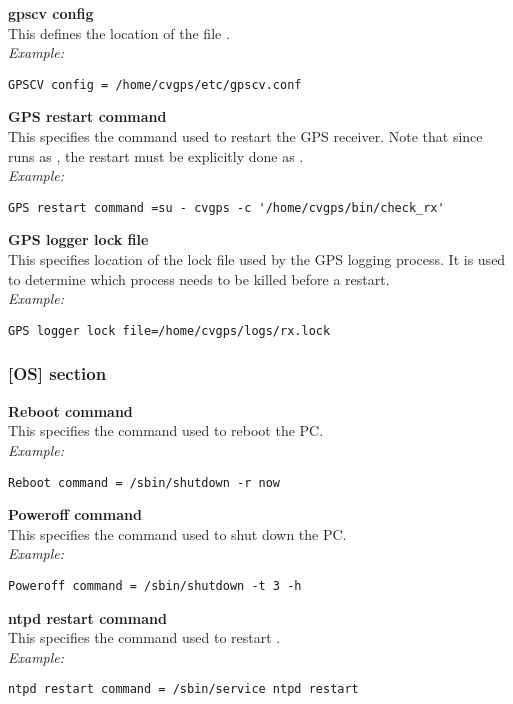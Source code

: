 {\bfseries gpscv config}\\
This defines the location of the file .\\
\textit{Example:}
\begin{lstlisting}
GPSCV config = /home/cvgps/etc/gpscv.conf
\end{lstlisting}

{\bfseries GPS restart command}\\
This specifies the command used to restart the GPS receiver. Note that since
 runs as , the restart must be explicitly done
as .\\
\textit{Example:}
\begin{lstlisting}
GPS restart command =su - cvgps -c '/home/cvgps/bin/check_rx'
\end{lstlisting}

{\bfseries GPS logger lock file}\\
This specifies location of the lock file used by the GPS logging process. It is
used to determine which process needs to be killed before a restart.\\
\textit{Example:}
\begin{lstlisting}
GPS logger lock file=/home/cvgps/logs/rx.lock
\end{lstlisting}

\subsubsection{[OS] section}
{\bfseries Reboot command}\\
This specifies the command used to reboot the PC.\\
\textit{Example:}
\begin{lstlisting}
Reboot command = /sbin/shutdown -r now
\end{lstlisting}

{\bfseries Poweroff command}\\
This specifies the command used to shut down the PC.\\
\textit{Example:}
\begin{lstlisting}
Poweroff command = /sbin/shutdown -t 3 -h
\end{lstlisting}

{\bfseries ntpd restart command}\\
This specifies the command used to restart .\\
\textit{Example:}
\begin{lstlisting}
ntpd restart command = /sbin/service ntpd restart
\end{lstlisting}

